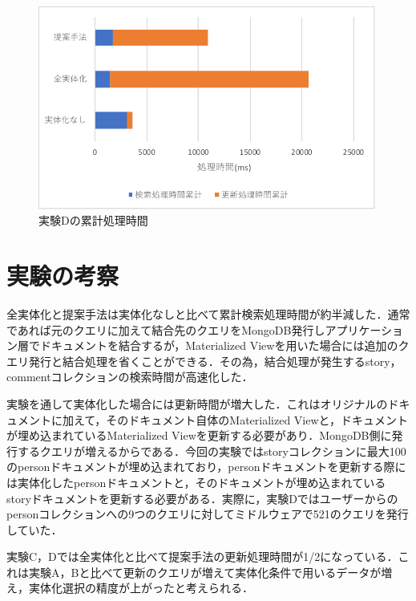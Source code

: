 \documentclass[a4paper,11pt]{ujreport}
\begin{document}
\begin{figure}[htbp]
	\begin{center}
		\includegraphics[width=30em]{src/ExperimentD-total.pdf} %
	\end{center}
	\caption{実験Dの累計処理時間}
	\label{ExperimentD-total}
\end{figure}

\section{実験の考察}
\label{sec:Consideration}
全実体化と提案手法は実体化なしと比べて累計検索処理時間が約半減した．通常であれば元のクエリに加えて結合先のクエリをMongoDB発行しアプリケーション層でドキュメントを結合するが，Materialized Viewを用いた場合には追加のクエリ発行と結合処理を省くことができる．その為，結合処理が発生するstory，commentコレクションの検索時間が高速化した．

実験を通して実体化した場合には更新時間が増大した．これはオリジナルのドキュメントに加えて，そのドキュメント自体のMaterialized Viewと，ドキュメントが埋め込まれているMaterialized Viewを更新する必要があり．MongoDB側に発行するクエリが増えるからである．今回の実験ではstoryコレクションに最大100のpersonドキュメントが埋め込まれており，personドキュメントを更新する際には実体化したpersonドキュメントと，そのドキュメントが埋め込まれているstoryドキュメントを更新する必要がある．実際に，実験Dではユーザーからのpersonコレクションへの9つのクエリに対してミドルウェアで521のクエリを発行していた．

実験C，Dでは全実体化と比べて提案手法の更新処理時間が1/2になっている．これは実験A，Bと比べて更新のクエリが増えて実体化条件で用いるデータが増え，実体化選択の精度が上がったと考えられる．
\end{document}
